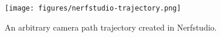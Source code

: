 \begin{figure}[!h]
    \centering
    \texttt{[image: figures/nerfstudio-trajectory.png]}
    \caption{An arbitrary camera path trajectory created in Nerfstudio.}
    \label{fig:nerfstudio-trajectory}
\end{figure}